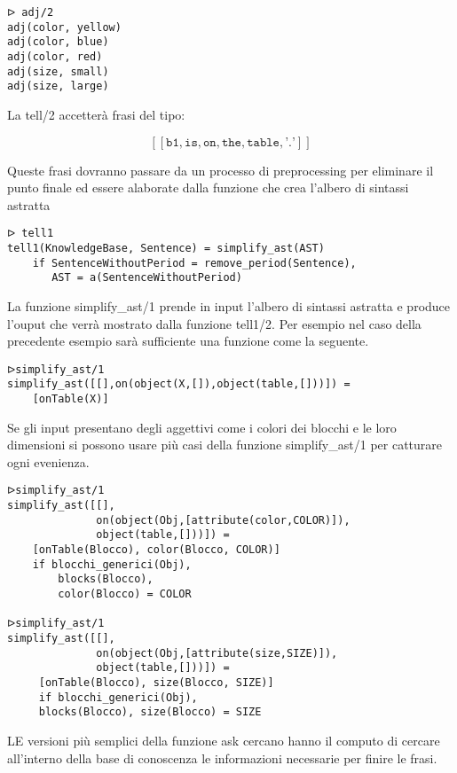 \documentclass[12pt,twoside]{report}
\begin{document}
\begin{lstlisting}
ᐅ adj/2
adj(color, yellow)
adj(color, blue)
adj(color, red)
adj(size, small)
adj(size, large)
\end{lstlisting}

La tell/2 accetterà frasi del tipo:

\[
[[ \texttt{b1}, \texttt{is}, \texttt{on}, \texttt{the}, \texttt{table}, \texttt{'.'} ]]
\]



Queste frasi dovranno passare da un processo di preprocessing per eliminare il punto finale ed essere alaborate dalla funzione che crea l'albero di sintassi astratta

\begin{lstlisting}
ᐅ tell1
tell1(KnowledgeBase, Sentence) = simplify_ast(AST)
    if SentenceWithoutPeriod = remove_period(Sentence),
       AST = a(SentenceWithoutPeriod)
\end{lstlisting}

La funzione simplify\_ast/1 prende in input l'albero di sintassi astratta e produce l'ouput che verrà mostrato dalla funzione tell1/2. Per esempio nel caso della precedente esempio sarà sufficiente una funzione come la seguente.

\begin{lstlisting}
ᐅsimplify_ast/1
simplify_ast([[],on(object(X,[]),object(table,[]))]) = 
    [onTable(X)]
\end{lstlisting}

Se gli input presentano degli aggettivi come i colori dei blocchi e le loro dimensioni si possono usare più casi della funzione simplify\_ast/1 per catturare ogni evenienza.

\begin{lstlisting}
ᐅsimplify_ast/1
simplify_ast([[],
              on(object(Obj,[attribute(color,COLOR)]),
              object(table,[]))]) = 
    [onTable(Blocco), color(Blocco, COLOR)]
    if blocchi_generici(Obj),  
        blocks(Blocco), 
        color(Blocco) = COLOR
        
ᐅsimplify_ast/1
simplify_ast([[],
              on(object(Obj,[attribute(size,SIZE)]),
              object(table,[]))]) = 
     [onTable(Blocco), size(Blocco, SIZE)]
     if blocchi_generici(Obj),  
     blocks(Blocco), size(Blocco) = SIZE
\end{lstlisting}

LE versioni più semplici della funzione ask cercano hanno il computo di cercare all'interno della base di conoscenza le informazioni necessarie per finire le frasi.
\end{document}
